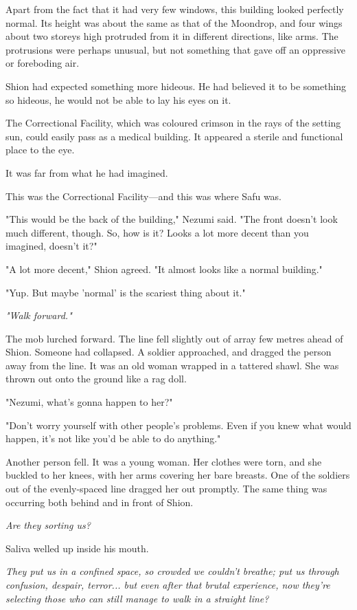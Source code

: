 Apart from the fact that it had very few windows, this building looked
perfectly normal. Its height was about the same as that of the Moondrop,
and four wings about two storeys high protruded from it in different
directions, like arms. The protrusions were perhaps unusual, but not
something that gave off an oppressive or foreboding air.

Shion had expected something more hideous. He had believed it to be
something so hideous, he would not be able to lay his eyes on it.~

The Correctional Facility, which was coloured crimson in the rays of the
setting sun, could easily pass as a medical building. It appeared a
sterile and functional place to the eye.

It was far from what he had imagined.

This was the Correctional Facility---and this was where Safu was.

"This would be the back of the building," Nezumi said. "The front
doesn't look much different, though. So, how is it? Looks a lot more
decent than you imagined, doesn't it?"

"A lot more decent," Shion agreed. "It almost looks like a normal
building."

"Yup. But maybe 'normal' is the scariest thing about it."

\emph{"Walk forward."}

The mob lurched forward. The line fell slightly out of array few metres
ahead of Shion. Someone had collapsed. A soldier approached, and dragged
the person away from the line. It was an old woman wrapped in a tattered
shawl. She was thrown out onto the ground like a rag doll.

"Nezumi, what's gonna happen to her?"

"Don't worry yourself with other people's problems. Even if you knew
what would happen, it's not like you'd be able to do anything."

Another person fell. It was a young woman. Her clothes were torn, and
she buckled to her knees, with her arms covering her bare breasts. One
of the soldiers out of the evenly-spaced line dragged her out promptly.
The same thing was occurring both behind and in front of Shion.

\emph{Are they sorting us?}

Saliva welled up inside his mouth.

\emph{They put us in a confined space, so crowded we couldn't breathe;
put us through confusion, despair, terror... but even after that brutal
experience, now they're selecting those who can still manage to walk in
a straight line?}


